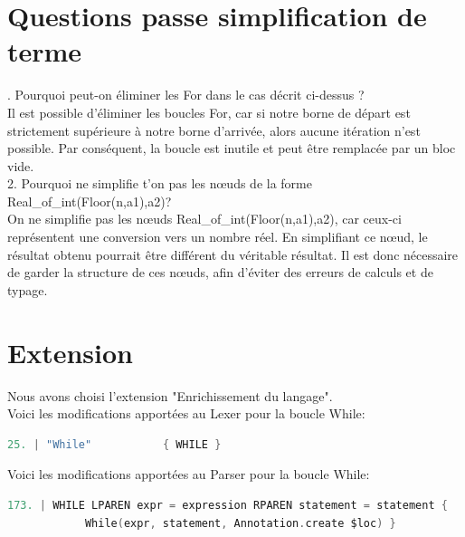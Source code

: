 \documentclass{report}
\begin{document}
    \newpage

    \section{Questions passe simplification de terme}

    . Pourquoi peut-on éliminer les For dans le cas décrit ci-dessus ? \\

    Il est possible d'éliminer les boucles For, car si notre borne de départ est strictement supérieure à notre borne d'arrivée, alors aucune itération n'est possible. Par conséquent, la boucle est inutile et peut être remplacée par un bloc vide. \\

    2. Pourquoi ne simplifie t'on pas les nœuds de la forme Real\_of\_int(Floor(n,a1),a2)? \\

    On ne simplifie pas les nœuds Real\_of\_int(Floor(n,a1),a2), car ceux-ci représentent une conversion vers un nombre réel. En simplifiant ce nœud, le résultat obtenu pourrait être différent du véritable résultat. Il est donc nécessaire de garder la structure de ces nœuds, afin d'éviter des erreurs de calculs et de typage.\\

    \section{Extension}

    Nous avons choisi l'extension "Enrichissement du langage".\\

    Voici les modifications apportées au Lexer pour la boucle While: \\

    \begin{lstlisting}[language=C, basicstyle=\ttfamily]
        25. | "While"           { WHILE }
    \end{lstlisting}

    Voici les modifications apportées au Parser pour la boucle While: \\

    \begin{lstlisting}[language=C, basicstyle=\ttfamily]
        173. | WHILE LPAREN expr = expression RPAREN statement = statement {
            While(expr, statement, Annotation.create $loc) }
    \end{lstlisting}
\end{document}
